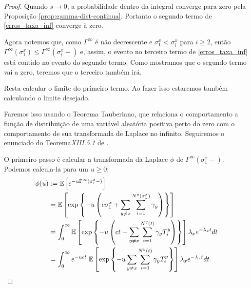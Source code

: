 \begin{proof}
  Quando $s \to 0$, a probabilidade dentro da integral converge para
  zero pela Proposição \ref{prop:gamma-dist-continua}. Portanto o
  segundo termo de \eqref{erros_taxa_inf} converge à zero.

  Agora notemos que, como $\Gamma^\infty$ é não decrescente e $\sigma^x_1
  < \sigma^x_i$ para $i \geq 2$, então $\Gamma^\infty(\sigma^x_1) \leq
  \Gamma^\infty(\sigma^x_i -)$ e, assim, o evento no terceiro termo de
  \eqref{erros_taxa_inf} está contido no evento do segundo
  termo. Como mostramos que o segundo termo vai a zero, teremos
  que o terceiro também irá.

  Resta calcular o limite do primeiro termo. Ao fazer isso
  estaremos também calculando o limite desejado.

  Faremos isso usando o Teorema Tauberiano, que relaciona o
  comportamento a função de distribuição de uma variável aleatória
  positiva perto do zero com o comportamento de sua transformada de
  Laplace no infinito.  Seguiremos o enunciado do
  Teorema\emph{XIII.5.1} de \cite{fellerv2}.

  O primeiro passo é calcular a transformada da Laplace $\phi$ de
  $\Gamma^\infty(\sigma^x_1-)$. Podemos calcula-la para um $u \geq 0$:
  \begin{align*}
    \phi (u) &:= {\mathbb{E}} \left[ e^{-u \Gamma^\infty (\sigma^x_1-)}  \right] \\
    &= {\mathbb{E}} \left[ \exp \left\{ -u \left( c \sigma^x_1+ \sum_{y \neq x}
          \sum_{i = 1}^{N^y(\sigma^x_1)}\gamma_y \right) \right\}
    \right] \\
    &= \int_0^\infty 
    {\mathbb{E}} \left[ \exp \left\{ -u \left( c t + \sum_{y \neq x}
          \sum_{i = 1}^{N^y(t)}\gamma_y T^y_i \right) \right\}
    \right]  \lambda_x e^{-\lambda_x t} d t \\
    &= \int_0^\infty
    e^{-u c t} \;
    {\mathbb{E}} \left[ \exp \left\{ -u \sum_{y \neq x}
          \sum_{i = 1}^{N^y(t)} \gamma_y T^y_i \right\}
    \right]  \lambda_x e^{- \lambda_x t} d t .
  \end{align*}
  

\end{proof}

